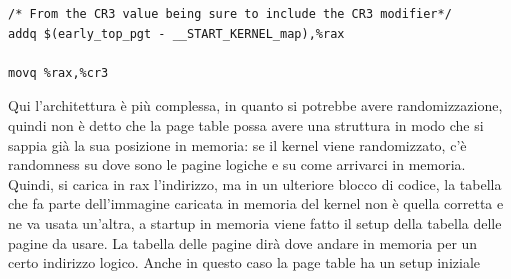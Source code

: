 \documentclass[12pt, oneside]{extbook}
\begin{document}
\begin{lstlisting}
/* From the CR3 value being sure to include the CR3 modifier*/
addq $(early_top_pgt - __START_KERNEL_map),%rax

movq %rax,%cr3
\end{lstlisting}
Qui l'architettura è  più complessa, in quanto si potrebbe avere randomizzazione, quindi non è detto che la page table possa avere una struttura in modo che si sappia già la sua posizione in memoria: se il kernel viene randomizzato, c'è randomness su dove sono le pagine logiche e su come arrivarci in memoria.\\ Quindi, si carica in rax l'indirizzo, ma in un ulteriore blocco di codice, la tabella che fa parte dell'immagine caricata in memoria del kernel non è quella corretta e ne va usata un'altra, a startup in memoria viene fatto il setup della tabella delle pagine da usare. La tabella delle pagine dirà dove andare in memoria per un certo indirizzo logico. Anche in questo caso la page table ha un setup iniziale
\end{document}
